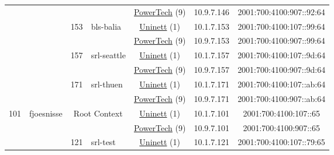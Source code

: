 \begin{small}
\begin{center}
\begin{longtable}{|c|c|c|c|c|c|c|c|}
  &  &  &  & \multicolumn{2}{|c|}{\tiny{\href{http://www.powertech.no}{PowerTech} (9)}} & \tiny{10.9.7.146} & \tiny{2001:700:4100:907::92:64} \\* \cline{3-3}\cline{4-4}\cline{5-5}\cline{6-6}\cline{7-7}\cline{8-8}
  &  & \multirow{2}{*}{\tiny{153}} & \multicolumn{1}{|l|}{\multirow{2}{*}{\tiny{bls-balia}}} & \multicolumn{2}{|c|}{\tiny{\href{https://www.uninett.no}{Uninett} (1)}} & \tiny{10.1.7.153} & \tiny{2001:700:4100:107::99:64} \\* \cline{5-5}\cline{6-6}\cline{7-7}\cline{8-8}
  &  &  &  & \multicolumn{2}{|c|}{\tiny{\href{http://www.powertech.no}{PowerTech} (9)}} & \tiny{10.9.7.153} & \tiny{2001:700:4100:907::99:64} \\* \cline{3-3}\cline{4-4}\cline{5-5}\cline{6-6}\cline{7-7}\cline{8-8}
  &  & \multirow{2}{*}{\tiny{157}} & \multicolumn{1}{|l|}{\multirow{2}{*}{\tiny{srl-seattle}}} & \multicolumn{2}{|c|}{\tiny{\href{https://www.uninett.no}{Uninett} (1)}} & \tiny{10.1.7.157} & \tiny{2001:700:4100:107::9d:64} \\* \cline{5-5}\cline{6-6}\cline{7-7}\cline{8-8}
  &  &  &  & \multicolumn{2}{|c|}{\tiny{\href{http://www.powertech.no}{PowerTech} (9)}} & \tiny{10.9.7.157} & \tiny{2001:700:4100:907::9d:64} \\* \cline{3-3}\cline{4-4}\cline{5-5}\cline{6-6}\cline{7-7}\cline{8-8}
  &  & \multirow{2}{*}{\tiny{171}} & \multicolumn{1}{|l|}{\multirow{2}{*}{\tiny{srl-thuen}}} & \multicolumn{2}{|c|}{\tiny{\href{https://www.uninett.no}{Uninett} (1)}} & \tiny{10.1.7.171} & \tiny{2001:700:4100:107::ab:64} \\* \cline{5-5}\cline{6-6}\cline{7-7}\cline{8-8}
  &  &  &  & \multicolumn{2}{|c|}{\tiny{\href{http://www.powertech.no}{PowerTech} (9)}} & \tiny{10.9.7.171} & \tiny{2001:700:4100:907::ab:64} \\ \hline
 \multirow{18}{*}{\tiny{101}} & \multicolumn{1}{|l|}{\multirow{18}{*}{\tiny{fjoesnisse}}} & \multicolumn{2}{|c|}{\multirow{2}{*}{\tiny{Root Context}}} & \multicolumn{2}{|c|}{\tiny{\href{https://www.uninett.no}{Uninett} (1)}} & \tiny{10.1.7.101} & \tiny{2001:700:4100:107::65} \\* \cline{5-5}\cline{6-6}\cline{7-7}\cline{8-8}
  &  & \multicolumn{2}{|c|}{} & \multicolumn{2}{|c|}{\tiny{\href{http://www.powertech.no}{PowerTech} (9)}} & \tiny{10.9.7.101} & \tiny{2001:700:4100:907::65} \\* \cline{3-3}\cline{4-4}\cline{5-5}\cline{6-6}\cline{7-7}\cline{8-8}
  &  & \multirow{2}{*}{\tiny{121}} & \multicolumn{1}{|l|}{\multirow{2}{*}{\tiny{srl-test}}} & \multicolumn{2}{|c|}{\tiny{\href{https://www.uninett.no}{Uninett} (1)}} & \tiny{10.1.7.121} & \tiny{2001:700:4100:107::79:65} \\* \cline{5-5}\cline{6-6}\cline{7-7}\cline{8-8}

\end{longtable}
\end{center}
\end{small}
